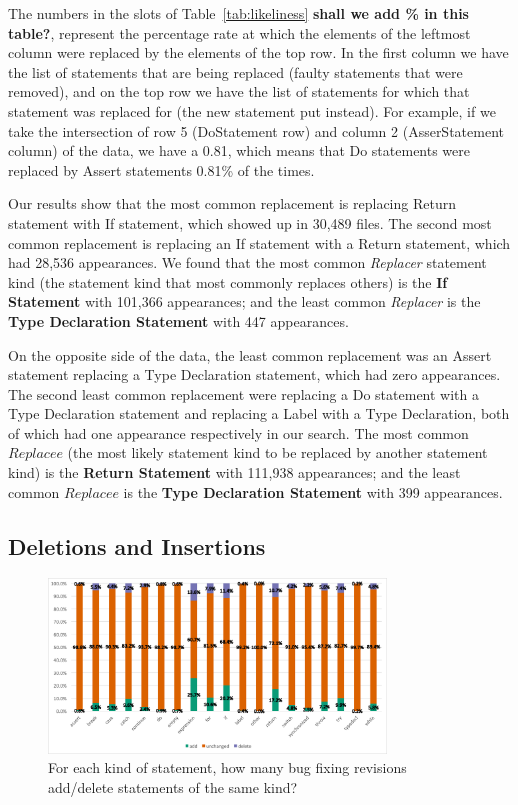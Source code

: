 \documentclass{sig-alternate-05-2015}
\newcommand{\todo}[1]
  {{\scriptsize \textbf{\color{red} {#1}}}}
\begin{document}
The numbers in the slots of Table~\ref{tab:likeliness} \todo{shall we add \% in
this table?}, represent the percentage rate at which the elements of the
leftmost column were replaced by the elements of the top row. In the first
column we have the list of statements that are being replaced (faulty statements
that were removed), and on the top row we have the list of statements for which
that statement was replaced for (the new statement put instead). For example, if
we take the intersection of row 5 (DoStatement row) and column 2 (AsserStatement
column) of the data, we have a 0.81, which means that Do statements were
replaced by Assert statements 0.81\% of the times.

Our results show that the most common replacement is replacing Return statement
with If statement, which showed up in 30,489 files. The second most common
replacement is replacing an If statement with a Return statement, which had
28,536 appearances. We found that the most common \emph{Replacer} statement kind
(the statement kind that most commonly replaces others) is the \textbf{If
Statement} with 101,366 appearances; and the least common \emph{Replacer} is the
\textbf{Type Declaration Statement} with 447 appearances.

On the opposite side of the data, the least common replacement was an Assert
statement replacing a Type Declaration statement, which had zero appearances.
The second least common replacement were replacing a Do statement with a Type
Declaration statement and replacing a Label with a Type Declaration, both of
which had one appearance respectively in our search. The most common $Replacee$
(the most likely statement kind to be replaced by another statement kind) is the
\textbf{Return Statement} with 111,938 appearances; and the least common
$Replacee$ is the \textbf{Type Declaration Statement} with 399 appearances.

\subsection{Deletions and Insertions}

\begin{figure}[!t] \centering \includegraphics[height=0.3\textheight,
	width=0.8\textwidth]{StmtType} \caption{For each kind of statement, how many
	bug fixing revisions add/delete statements of the same kind?}
	\label{fig:StmtType} \end{figure}
\end{document}
